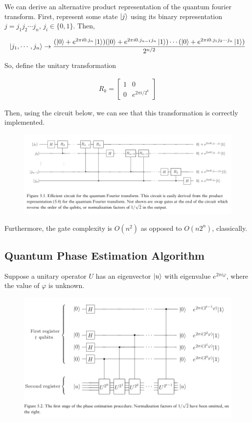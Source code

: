 \documentclass[11pt]{article}
\newcommand\0{\mathbf{0}}
\newcommand\<{\langle}
\renewcommand\>{\rangle}
\renewcommand\phi{\varphi}
\begin{document}
We can derive an alternative product representation of the quantum fourier transform. First, represent some state $\ket{j}$ using its binary representation $j=j_1j_2 \cdots j_n$, $j_i \in \{0, 1\}$. Then,

\begin{align*}
\ket{j_1 , \cdots , j_n } \rightarrow \frac{(\ket{0} + e^{2\pi i 0.j_n} \ket{1})(\ket{0} + e^{2\pi i 0.j_{n-1}j_n} \ket{1})\cdots (\ket{0} + e^{2\pi i 0.j_1j_2 \cdots j_n} \ket{1})}{2^{n/2}}
\end{align*}

So, define the unitary transformation

\begin{align}
	R_k = \begin{bmatrix}
 1 & 0 \\ 0 & e^{2\pi i / 2^k}	
 \end{bmatrix}
\end{align}

Then, using the circuit below, we can see that this transformation is correctly implemented.

\begin{figure}[H]
\centering
\includegraphics[width=\linewidth]{qfft.png}	
\end{figure}

Furthermore, the gate complexity is $O(n^2)$ as opposed to $O(n2^n)$, classically. 

\subsection{Quantum Phase Estimation Algorithm}\label{phase_estimation}

Suppose a unitary operator $U$ has an eigenvector $\ket{u}$ with eigenvalue $e^{2\pi i \phi}$, where the value of $\phi$ is unknown. 

\begin{figure}[H]
\centering
\includegraphics[width=\linewidth]{phase_estim.png}	
\end{figure}
\end{document}
